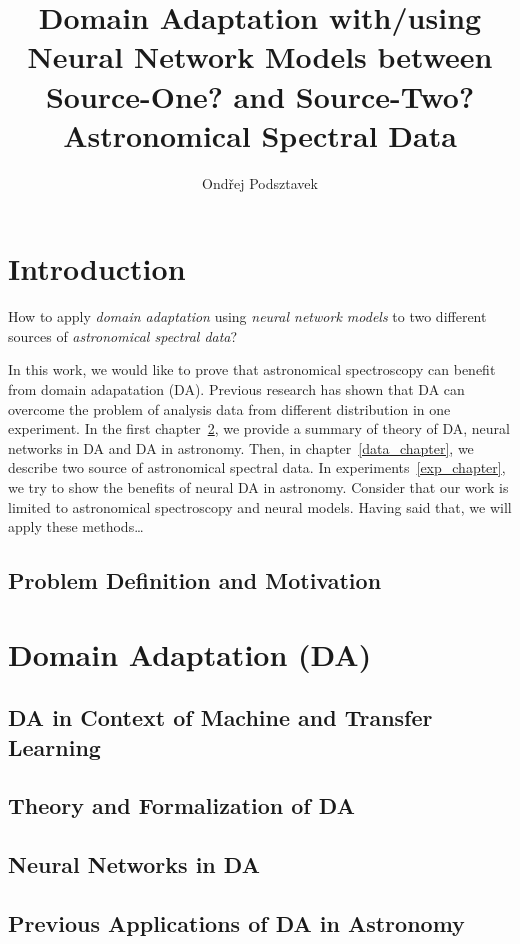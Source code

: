 \documentclass[thesis=M,english]{FITthesis}[2012/10/20]
\title{Domain Adaptation with/using Neural Network Models between Source-One? and Source-Two? Astronomical Spectral Data}
\author{Ondřej Podsztavek}
\begin{document}
\chapter{Introduction}

How to apply \textit{domain adaptation} using \textit{neural network models} to two different sources of \textit{astronomical spectral data}?

In this work, we would like to prove that astronomical spectroscopy can benefit from domain adapatation (DA).
Previous research has shown that DA can overcome the problem of analysis data from different distribution in one experiment.
In the first chapter~\ref{da_chapter}, we provide a summary of theory of DA, neural networks in DA and DA in astronomy.
Then, in chapter~\ref{data_chapter}, we describe two source of astronomical spectral data.
In experiments~\ref{exp_chapter}, we try to show the benefits of neural DA in astronomy.
Consider that our work is limited to astronomical spectroscopy and neural models.
Having said that, we will apply these methods\dots{}

\section{Problem Definition and Motivation}

\chapter{Domain Adaptation (DA)}
\label{da_chapter}

\section{DA in Context of Machine and Transfer Learning}

\section{Theory and Formalization of DA}

\section{Neural Networks in DA}

\section{Previous Applications of DA in Astronomy}
\end{document}
